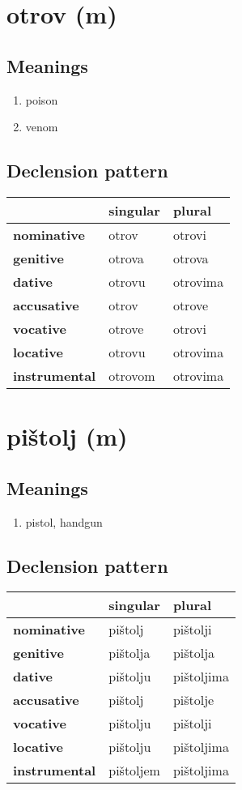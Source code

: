 \filbreak
\section{otrov (m)}
\subsection*{Meanings}
\begin{enumerate}
\item poison
\item venom
\end{enumerate}
\subsection*{Declension pattern}
\begin{tabularx}{\linewidth}{Xll}
\toprule
{} & singular &    plural \\
\midrule
\textbf{nominative  } &    otrov &    otrovi \\
\textbf{genitive    } &   otrova &    otrova \\
\textbf{dative      } &   otrovu &  otrovima \\
\textbf{accusative  } &    otrov &    otrove \\
\textbf{vocative    } &   otrove &    otrovi \\
\textbf{locative    } &   otrovu &  otrovima \\
\textbf{instrumental} &  otrovom &  otrovima \\
\bottomrule
\end{tabularx}

\filbreak
\section{pištolj (m)}
\subsection*{Meanings}
\begin{enumerate}
\item pistol, handgun
\end{enumerate}
\subsection*{Declension pattern}
\begin{tabularx}{\linewidth}{Xll}
\toprule
{} &   singular &      plural \\
\midrule
\textbf{nominative  } &    pištolj &    pištolji \\
\textbf{genitive    } &   pištolja &    pištolja \\
\textbf{dative      } &   pištolju &  pištoljima \\
\textbf{accusative  } &    pištolj &    pištolje \\
\textbf{vocative    } &   pištolju &    pištolji \\
\textbf{locative    } &   pištolju &  pištoljima \\
\textbf{instrumental} &  pištoljem &  pištoljima \\
\bottomrule
\end{tabularx}

